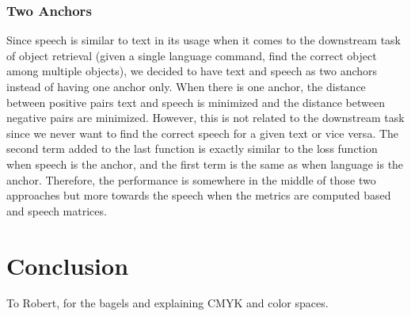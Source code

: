 \documentclass[sigconf,natbib=true,anonymous=true]{acmart}
\begin{document}
\subsubsection{Two Anchors}
Since speech is similar to text in its usage when it comes to the downstream task of object retrieval (given a single language command, find the correct object among multiple objects), we decided to have text and speech as two anchors instead of having one anchor only. When there is one anchor, the distance between positive pairs text and speech is minimized and the distance between negative pairs are minimized. However, this is not related to the downstream task since we never want to find the correct speech for a given text or vice versa. The second term added to the last function is exactly similar to the loss function when speech is the anchor, and the first term is the same as when language is the anchor. Therefore, the performance is somewhere in the middle of those two approaches but more towards the speech when the metrics are computed based and speech matrices.









\section{Conclusion}
\label{sec:conclusion}





\begin{acks}
To Robert, for the bagels and explaining CMYK and color spaces.
\end{acks}



\clearpage
\clearpage


\end{document}
